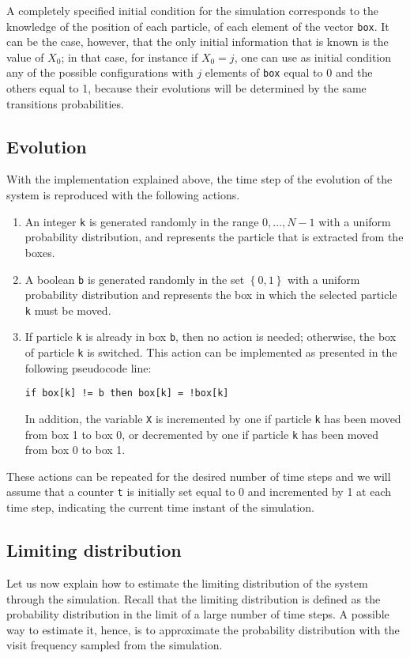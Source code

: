 A completely specified initial condition for the simulation corresponds to the knowledge of the position of each particle, \ie of each element of the vector \texttt{box}. It can be the case, however, that the only initial information that is known is the value of $X_0$; in that case, for instance if $X_0 = j$, one can use as initial condition any of the possible configurations with $j$ elements of \texttt{box} equal to 0 and the others equal to 1, because their evolutions will be determined by the same transitions probabilities.

\subsection{Evolution}
With the implementation explained above, the time step of the evolution of the system is reproduced with the following actions. 

\begin{enumerate}
    \item An integer \texttt{k} is generated randomly in the range $0,\dots, N-1$ with a uniform probability distribution, and represents the particle that is extracted from the boxes.
    \item A boolean \texttt{b} is generated randomly in the set $\left\{0,1\right\}$ with a uniform probability distribution and represents the box in which the selected particle \texttt{k} must be moved.
    \item If particle \texttt{k} is already in box \texttt{b}, then no action is needed; otherwise, the box of particle \texttt{k} is switched. This action can be implemented as presented in the following pseudocode line:
    \begin{center}
        \texttt{if box[k] != b then box[k] = !box[k]}
    \end{center}
    In addition, the variable \texttt{X} is incremented by one if particle \texttt{k} has been moved from box 1 to box 0, or decremented by one if particle \texttt{k} has been moved from box 0 to box 1.
\end{enumerate}
These actions can be repeated for the desired number of time steps and we will assume that a counter \texttt{t} is initially set equal to 0 and incremented by 1 at each time step, indicating the current time instant of the simulation.

\subsection{Limiting distribution}
Let us now explain how to estimate the limiting distribution of the system through the simulation. Recall that the limiting distribution is defined as the probability distribution in the limit of a large number of time steps. A possible way to estimate it, hence, is to approximate the probability distribution  with the visit frequency sampled from the simulation. 

